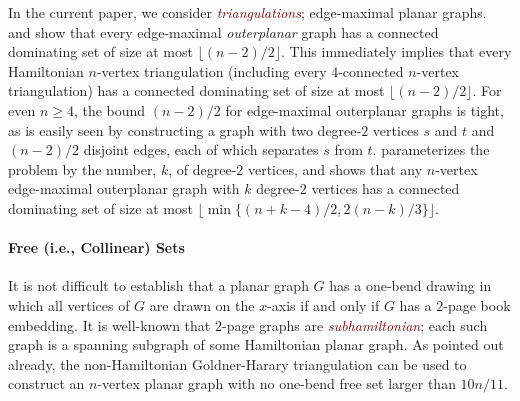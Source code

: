 \documentclass{article}
\newcommand{\pat}[1]{\textcolor{red}{PM: #1}}
\newcommand{\defin}[1]{\emph{\textcolor{Maroon}{#1}}}
\theoremstyle{definition}
\begin{document}
In the current paper, we consider \defin{triangulations}; edge-maximal planar graphs. \citet{hernandez:vigilancia} and \citet{chen.hao.ea:bounds} show that every edge-maximal \emph{outerplanar} graph has a connected dominating set of size at most $\lfloor (n-2)/2\rfloor$. This immediately implies that every Hamiltonian $n$-vertex triangulation (including every $4$-connected $n$-vertex triangulation) has a connected dominating set of size at most $\lfloor (n-2)/2\rfloor$.  For even $n\ge 4$, the bound $(n-2)/2$ for edge-maximal outerplanar graphs is tight, as is easily seen by constructing a graph with two degree-$2$ vertices $s$ and $t$ and $(n-2)/2$ disjoint edges, each of which separates $s$ from $t$.  \citet{zhuang:connected} parameterizes the problem by the number, $k$,  of degree-$2$ vertices, and shows that any $n$-vertex edge-maximal outerplanar graph with $k$ degree-$2$ vertices has a connected dominating set of size at most $\lfloor\min\{(n+k-4)/2,2(n-k)/3\}\rfloor$.

%
%
%
%

\paragraph{Free (i.e., Collinear) Sets}

It is not difficult to establish that a planar graph $G$ has a one-bend drawing in which all vertices of $G$ are drawn on the $x$-axis if and only if $G$ has a $2$-page book embedding. It is well-known that $2$-page graphs are \defin{subhamiltonian}; each such graph is a spanning subgraph of some Hamiltonian planar graph. As pointed out already, the non-Hamiltonian Goldner-Harary triangulation can be used to construct an $n$-vertex planar graph with no one-bend free set larger than $10n/11$.
\end{document}
